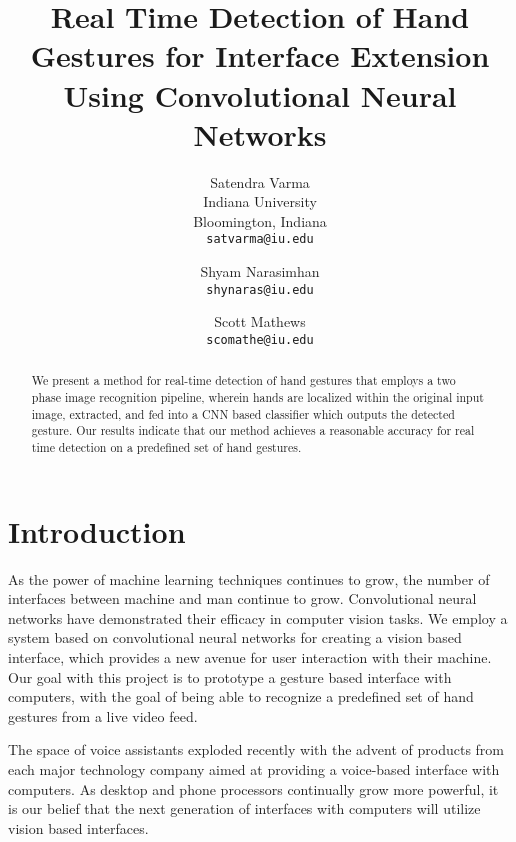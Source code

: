 \documentclass[10pt,twocolumn,letterpaper]{article}
\begin{document}
\title{Real Time Detection of Hand Gestures for Interface Extension Using Convolutional Neural Networks}

\author{Satendra Varma\\
Indiana University\\
Bloomington, Indiana\\
{\tt\small satvarma@iu.edu}
\and
Shyam Narasimhan\\
{\tt\small shynaras@iu.edu}
\and
Scott Mathews\\
{\tt\small scomathe@iu.edu}\\
}

\maketitle

\begin{abstract}
   We present a method for real-time detection of hand gestures that employs a two phase image recognition pipeline, wherein hands are localized within the original input image, extracted, and fed into a CNN based classifier which outputs the detected gesture. Our results indicate that our method achieves a reasonable accuracy for real time detection on a predefined set of hand gestures.
\end{abstract}

\section{Introduction}

As the power of machine learning techniques continues to grow, the number of interfaces between machine and man continue to grow. Convolutional neural networks have demonstrated their efficacy in computer vision tasks. We employ a system based on convolutional neural networks for creating a vision based interface, which provides a new avenue for user interaction with their machine. Our goal with this project is to prototype a gesture based interface with computers, with the goal of being able to recognize a predefined set of hand gestures from  a live video feed.

The space of voice assistants exploded recently with the advent of products from each major technology company aimed at providing a voice-based interface with computers. As desktop and phone processors continually grow more powerful, it is our belief that the next generation of interfaces with computers will utilize vision based interfaces.
\end{document}
